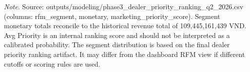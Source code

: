 \begin{table}[H]
\centering
\small
\caption{Dealer Segment Value Summary}
\label{tab:dealer}
\begin{flushleft}
\footnotesize \textit{Note.} Source: outputs/modeling/phase3\_dealer\_priority\_ranking\_q2\_2026.csv (columns: rfm\_segment, monetary, marketing\_priority\_score). Segment monetary totals reconcile to the historical revenue total of 109,445,161,439 VND. Avg Priority is an internal ranking score and should not be interpreted as a calibrated probability. The segment distribution is based on the final dealer priority ranking artifact. It may differ from the dashboard RFM view if different cutoffs or scoring rules are used.
\end{flushleft}
\end{table}
